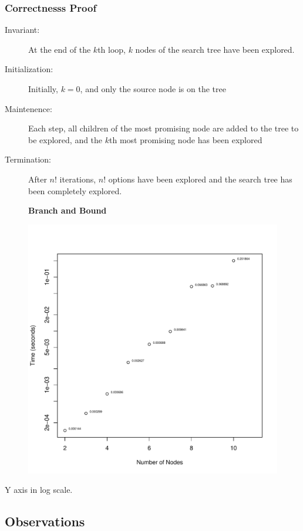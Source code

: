 \documentclass[a4paper,12pt]{article}
\begin{document}
\subsubsection{Correctnesss Proof}
\begin{description}
\item [Invariant: ] At the end of the $k$th loop, $k$ nodes of the search tree have been explored.
\item [Initialization: ] Initially, $k = 0$, and only the source node is on the tree 
\item [Maintenence: ] Each step, all children of the most promising node are added to the tree to be explored, and the $k$th most promising node has been explored
\item [Termination: ] After $n!$ iterations, $n!$ options have been explored and the search tree has been completely explored.
\end{description}
\begin{figure}[H]
  \centering
  \textbf{Branch and Bound}\par\medskip
  \includegraphics[width=1\linewidth]{BranchAndBound.pdf}
\end{figure}
Y axis in log scale.
\subsection{Observations}
\end{document}
